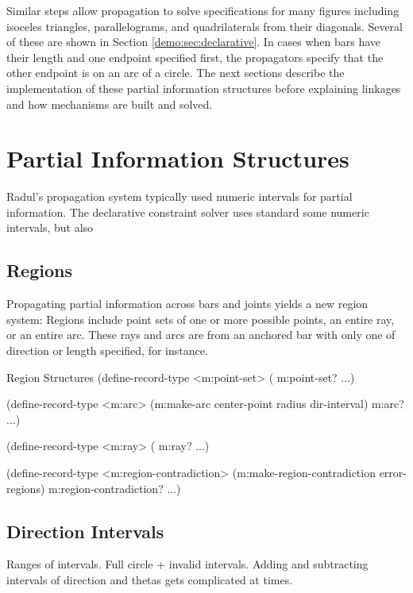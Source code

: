 Similar steps allow propagation to solve specifications for many
figures including isoceles triangles, parallelograms, and
quadrilaterals from their diagonals. Several of these are shown in
Section \ref{demo:sec:declarative}. In cases when bars have their
length and one endpoint specified first, the propagators specify that
the other endpoint is on an arc of a circle. The next sections
describe the implementation of these partial information structures
before explaining linkages and how mechanisms are built and solved.

\newpage
\section{Partial Information Structures}

Radul's propagation system typically used numeric intervals for
partial information. The declarative constraint solver uses standard
some numeric intervals, but also

\subsection{Regions}

Propagating partial information across bars and joints yields a new
region system: Regions include point sets of one or more possible
points, an entire ray, or an entire arc. These rays and arcs are
from an anchored bar with only one of direction or length specified,
for instance.

\begin{code-listing}
[label=regions]
{Region Structures}
(define-record-type <m:point-set>
  (%
  m:point-set? ...)

(define-record-type <m:arc>
  (m:make-arc center-point radius dir-interval)
  m:arc? ...)

(define-record-type <m:ray>
  (%
  m:ray? ...)

(define-record-type <m:region-contradiction>
  (m:make-region-contradiction error-regions)
  m:region-contradiction? ...)
\end{code-listing}

\subsection{Direction Intervals}

Ranges of intervals. Full circle + invalid intervals. Adding and
subtracting intervals of direction and thetas gets complicated at times.

